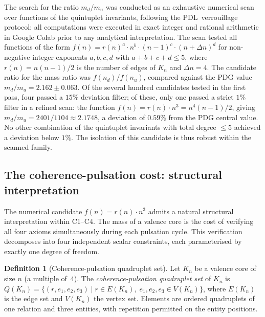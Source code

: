\documentclass[12pt,a4paper]{article}
\def\PDL{PDL}
\def\QQ{Q}
\theoremstyle{plain}
\theoremstyle{definition}
\newtheorem{definition}[theorem]{Definition}
\theoremstyle{remark}
\newcommand{\PDL}{\textnormal{PDL}}
\newcommand{\nnu}{n_u}
\newcommand{\nnd}{n_d}
\newcommand{\Dn}{\Delta n}
\newcommand{\mup}{m_u}
\newcommand{\mdown}{m_d}
\newcommand{\QQ}{\mathcal{Q}}
\begin{document}
The search for the ratio $\mdown/\mup$ was conducted as an exhaustive numerical scan over functions of the quintuplet invariants, following the \PDL\ verrouillage protocol: all computations were executed in exact integer and rational arithmetic in Google Colab prior to any analytical interpretation. The scan tested all functions of the form $f(n) = r(n)^a \cdot n^b \cdot (n-1)^c \cdot (n+\Dn)^d$ for non-negative integer exponents $a, b, c, d$ with $a+b+c+d \leq 5$, where $r(n) = n(n-1)/2$ is the number of edges of $K_n$ and $\Dn = 4$. The candidate ratio for the mass ratio was $f(\nnd)/f(\nnu)$, compared against the PDG value $\mdown/\mup = 2.162 \pm 0.063$. Of the several hundred candidates tested in the first pass, four passed a $15\%$ deviation filter; of these, only one passed a strict $1\%$ filter in a refined scan: the function $f(n) = r(n) \cdot n^3 = n^4(n-1)/2$, giving $\mdown/\mup = 2401/1104 \approx 2.1748$, a deviation of $0.59\%$ from the PDG central value. No other combination of the quintuplet invariants with total degree $\leq 5$ achieved a deviation below $1\%$. The isolation of this candidate is thus robust within the scanned family.

\subsection{The coherence-pulsation cost: structural interpretation}
\label{subsec:cost}

The numerical candidate $f(n) = r(n) \cdot n^3$ admits a natural structural interpretation within C1--C4. The mass of a valence core is the cost of verifying all four axioms simultaneously during each pulsation cycle. This verification decomposes into four independent scalar constraints, each parameterised by exactly one degree of freedom.

\begin{definition}[Coherence-pulsation quadruplet set]\label{def:quadruplet}
Let $K_n$ be a valence core of size $n$ (a multiple of~$4$). The \emph{coherence-pulsation quadruplet set} of $K_n$ is $\QQ(K_n) = \{(r, e_1, e_2, e_3) \mid r \in E(K_n),\; e_1, e_2, e_3 \in V(K_n)\}$, where $E(K_n)$ is the edge set and $V(K_n)$ the vertex set. Elements are ordered quadruplets of one relation and three entities, with repetition permitted on the entity positions.
\end{definition}
\end{document}
